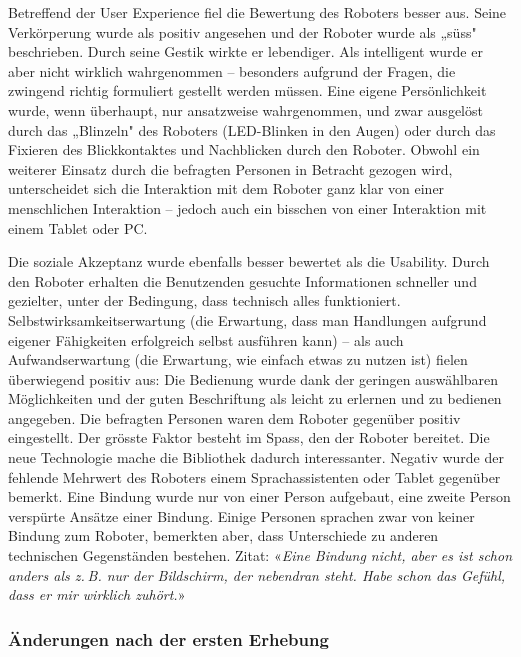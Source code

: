 \documentclass[a4paper,
fontsize=11pt,
oneside,
numbers=noperiodatend,
parskip=half-,
bibliography=totoc,
final
]{scrartcl}
\begin{document}
Betreffend der User Experience fiel die Bewertung des Roboters besser
aus. Seine Verkörperung wurde als positiv angesehen und der Roboter
wurde als „süss" beschrieben. Durch seine Gestik wirkte er lebendiger.
Als intelligent wurde er aber nicht wirklich wahrgenommen -- besonders
aufgrund der Fragen, die zwingend richtig formuliert gestellt werden
müssen. Eine eigene Persönlichkeit wurde, wenn überhaupt, nur
ansatzweise wahrgenommen, und zwar ausgelöst durch das „Blinzeln" des
Roboters (LED-Blinken in den Augen) oder durch das Fixieren des
Blickkontaktes und Nachblicken durch den Roboter. Obwohl ein weiterer
Einsatz durch die befragten Personen in Betracht gezogen wird,
unterscheidet sich die Interaktion mit dem Roboter ganz klar von einer
menschlichen Interaktion -- jedoch auch ein bisschen von einer
Interaktion mit einem Tablet oder PC.

Die soziale Akzeptanz wurde ebenfalls besser bewertet als die Usability.
Durch den Roboter erhalten die Benutzenden gesuchte Informationen
schneller und gezielter, unter der Bedingung, dass technisch alles
funktioniert. Selbstwirksamkeitserwartung (die Erwartung, dass man
Handlungen aufgrund eigener Fähigkeiten erfolgreich selbst ausführen
kann) -- als auch Aufwandserwartung (die Erwartung, wie einfach etwas zu
nutzen ist) fielen überwiegend positiv aus: Die Bedienung wurde dank der
geringen auswählbaren Möglichkeiten und der guten Beschriftung als
leicht zu erlernen und zu bedienen angegeben. Die befragten Personen
waren dem Roboter gegenüber positiv eingestellt. Der grösste Faktor
besteht im Spass, den der Roboter bereitet. Die neue Technologie mache
die Bibliothek dadurch interessanter. Negativ wurde der fehlende
Mehrwert des Roboters einem Sprachassistenten oder Tablet gegenüber
bemerkt. Eine Bindung wurde nur von einer Person aufgebaut, eine zweite
Person verspürte Ansätze einer Bindung. Einige Personen sprachen zwar
von keiner Bindung zum Roboter, bemerkten aber, dass Unterschiede zu
anderen technischen Gegenständen bestehen. Zitat: «\emph{Eine Bindung
nicht, aber es ist schon anders als z. B. nur der Bildschirm, der
nebendran steht. Habe schon das Gefühl, dass er mir wirklich zuhört.}»

\hypertarget{uxe4nderungen-nach-der-ersten-erhebung}{%
\subsubsection{Änderungen nach der ersten Erhebung}\label{uxe4nderungen-nach-der-ersten-erhebung}}
\end{document}
